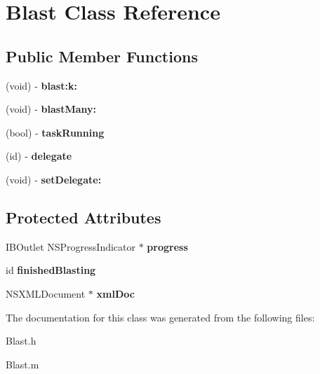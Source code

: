 \hypertarget{interface_blast}{
\section{Blast Class Reference}
\label{interface_blast}
}
\subsection*{Public Member Functions}
\begin{DoxyCompactItemize}
\item 
\hypertarget{interface_blast_aafd5e6590219b60be8a5177c924b88a1}{
(void) -\/ {\bfseries blast:k:}}
\label{interface_blast_aafd5e6590219b60be8a5177c924b88a1}

\item 
\hypertarget{interface_blast_a63bc9159298dba7135abb3af53aaf7a2}{
(void) -\/ {\bfseries blastMany:}}
\label{interface_blast_a63bc9159298dba7135abb3af53aaf7a2}

\item 
\hypertarget{interface_blast_acfdd41d541a602510eec296f4721fbaa}{
(bool) -\/ {\bfseries taskRunning}}
\label{interface_blast_acfdd41d541a602510eec296f4721fbaa}

\item 
\hypertarget{interface_blast_a55f79b30b2f3f10ac7f16af0cdb1b029}{
(id) -\/ {\bfseries delegate}}
\label{interface_blast_a55f79b30b2f3f10ac7f16af0cdb1b029}

\item 
\hypertarget{interface_blast_aab2ce2cf1861428e49b03d3f593f2ec2}{
(void) -\/ {\bfseries setDelegate:}}
\label{interface_blast_aab2ce2cf1861428e49b03d3f593f2ec2}

\end{DoxyCompactItemize}
\subsection*{Protected Attributes}
\begin{DoxyCompactItemize}
\item 
\hypertarget{interface_blast_a32f52ea099ac0162be7d065eb05fde3e}{
IBOutlet NSProgressIndicator $\ast$ {\bfseries progress}}
\label{interface_blast_a32f52ea099ac0162be7d065eb05fde3e}

\item 
\hypertarget{interface_blast_aa680d177b7df79c1eceba6d1dbf734ad}{
id {\bfseries finishedBlasting}}
\label{interface_blast_aa680d177b7df79c1eceba6d1dbf734ad}

\item 
\hypertarget{interface_blast_ad4d8c08f25ea7105a07add8972d4dc94}{
NSXMLDocument $\ast$ {\bfseries xmlDoc}}
\label{interface_blast_ad4d8c08f25ea7105a07add8972d4dc94}

\end{DoxyCompactItemize}


The documentation for this class was generated from the following files:\begin{DoxyCompactItemize}
\item 
Blast.h\item 
Blast.m\end{DoxyCompactItemize}

